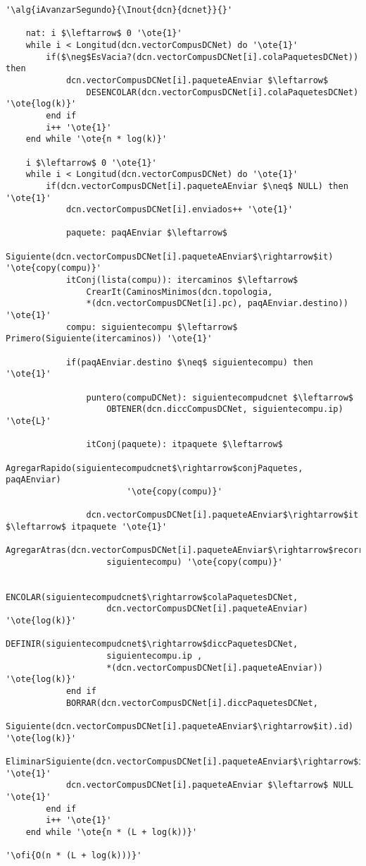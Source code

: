 \begin{lstlisting}[mathescape]
'\alg{iAvanzarSegundo}{\Inout{dcn}{dcnet}}{}'

	nat: i $\leftarrow$ 0 '\ote{1}'
	while i < Longitud(dcn.vectorCompusDCNet) do '\ote{1}'
		if($\neg$EsVacia?(dcn.vectorCompusDCNet[i].colaPaquetesDCNet)) then
			dcn.vectorCompusDCNet[i].paqueteAEnviar $\leftarrow$ 
				DESENCOLAR(dcn.vectorCompusDCNet[i].colaPaquetesDCNet) '\ote{log(k)}'
		end if
		i++ '\ote{1}'
	end while '\ote{n * log(k)}'

	i $\leftarrow$ 0 '\ote{1}'
	while i < Longitud(dcn.vectorCompusDCNet) do '\ote{1}'
		if(dcn.vectorCompusDCNet[i].paqueteAEnviar $\neq$ NULL) then '\ote{1}'
			dcn.vectorCompusDCNet[i].enviados++ '\ote{1}'

			paquete: paqAEnviar $\leftarrow$ 
				Siguiente(dcn.vectorCompusDCNet[i].paqueteAEnviar$\rightarrow$it) '\ote{copy(compu)}'
			itConj(lista(compu)): itercaminos $\leftarrow$ 
				CrearIt(CaminosMinimos(dcn.topologia, 
				*(dcn.vectorCompusDCNet[i].pc), paqAEnviar.destino)) '\ote{1}'
			compu: siguientecompu $\leftarrow$ Primero(Siguiente(itercaminos)) '\ote{1}'

			if(paqAEnviar.destino $\neq$ siguientecompu) then '\ote{1}'

				puntero(compuDCNet): siguientecompudcnet $\leftarrow$ 
					OBTENER(dcn.diccCompusDCNet, siguientecompu.ip) '\ote{L}'
				
				itConj(paquete): itpaquete $\leftarrow$ 
					AgregarRapido(siguientecompudcnet$\rightarrow$conjPaquetes, paqAEnviar) 
						'\ote{copy(compu)}'
				
				dcn.vectorCompusDCNet[i].paqueteAEnviar$\rightarrow$it $\leftarrow$ itpaquete '\ote{1}'
				AgregarAtras(dcn.vectorCompusDCNet[i].paqueteAEnviar$\rightarrow$recorrido, 
					siguientecompu) '\ote{copy(compu)}'

				ENCOLAR(siguientecompudcnet$\rightarrow$colaPaquetesDCNet, 
					dcn.vectorCompusDCNet[i].paqueteAEnviar) '\ote{log(k)}'
				DEFINIR(siguientecompudcnet$\rightarrow$diccPaquetesDCNet, 
					siguientecompu.ip ,
					*(dcn.vectorCompusDCNet[i].paqueteAEnviar)) '\ote{log(k)}'
			end if
			BORRAR(dcn.vectorCompusDCNet[i].diccPaquetesDCNet,
				Siguiente(dcn.vectorCompusDCNet[i].paqueteAEnviar$\rightarrow$it).id) '\ote{log(k)}'
			EliminarSiguiente(dcn.vectorCompusDCNet[i].paqueteAEnviar$\rightarrow$it) '\ote{1}'
			dcn.vectorCompusDCNet[i].paqueteAEnviar $\leftarrow$ NULL '\ote{1}'
		end if
		i++ '\ote{1}'
	end while '\ote{n * (L + log(k))}'	

'\ofi{O(n * (L + log(k)))}'
\end{lstlisting}


